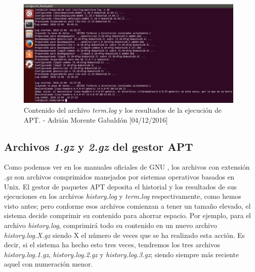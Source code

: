	\begin{figure}[H]
		\centering
		\includegraphics[scale=0.4]{apt-term}
		\caption{Contenido del archivo \emph{term.log} y los resultados de la ejecución de APT. - Adrián Morente Gabaldón [04/12/2016]}
		\label{figura2}
	\end{figure}

	\subsection{Archivos \emph{1.gz} y \emph{2.gz} del gestor APT}
	Como podemos ver en los manuales oficiales de GNU \cite{gzip}, los archivos con extensión \emph{.gz} son archivos comprimidos manejados por sistemas operativos basados en Unix. El gestor de paquetes APT deposita el historial y los resultados de sus ejecuciones en los archivos \emph{history.log} y \emph{term.log} respectivamente, como hemos visto antes; pero conforme esos archivos comienzan a tener un tamaño elevado, el sistema decide comprimir su contenido para ahorrar espacio. Por ejemplo, para el archivo \emph{history.log}, comprimirá todo su contenido en un nuevo archivo \emph{history.log.X.gz} siendo X el número de veces que se ha realizado esta acción. Es decir, si el sistema ha hecho esto tres veces, tendremos los tres archivos \emph{history.log.1.gz}, \emph{history.log.2.gz} y \emph{history.log.3.gz}; siendo siempre más reciente aquel con numeración menor.

